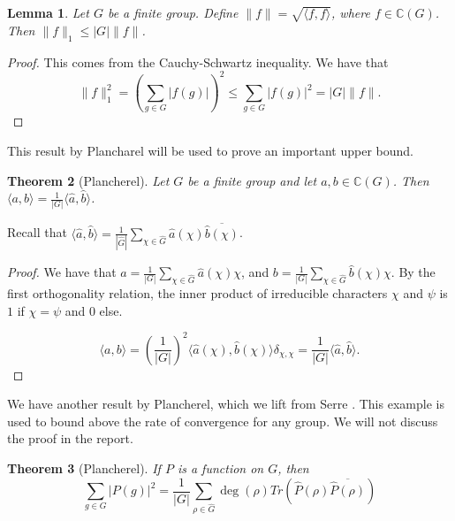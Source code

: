 \documentclass[]{article}
\newtheorem{theorem}{Theorem}
\newtheorem{lemma}[theorem]{Lemma}
\theoremstyle{definition}
\numberwithin{theorem}{section}
\numberwithin{equation}{section}
\begin{document}
\begin{lemma}
	\label{lem:Absolute Value Inequality}
	Let $G$ be a finite group. Define $\|f\| = \sqrt{\langle f, f \rangle}$, where $f \in \mathbb{C}(G)$. Then $\|f \|_1 \leq |G| \|f \|$.
\end{lemma}
\begin{proof}
	This comes from the Cauchy-Schwartz inequality. We have that \begin{equation}
		\| f \|_1^2 = \left(\sum_{g \in G} |f(g)|\right)^2 \leq \sum_{g \in G} |f(g)|^2 = |G| \| f\|.
	\end{equation}
\end{proof}
This result by Plancharel will be used to prove an important upper bound. 

\begin{theorem}[Plancherel]
	\label{thm:Plancherel}
	Let $G$ be a finite group and let $a, b \in \mathbb{C}(G)$. Then $\langle a, b \rangle = \frac{1}{|G|} \langle \widehat{a}, \widehat{b} \rangle$. 
\end{theorem}
Recall that $\langle \widehat{a}, \widehat{b} \rangle = \frac{1}{|\widehat{G}|} \sum_{\chi \in \widehat{G}} \widehat{a}(\chi) \overline{\widehat{b}(\chi)}$. 
\begin{proof}
	We have that $a =\frac{1}{|G|} \sum_{\chi \in \widehat{G}} \widehat{a}(\chi) \chi$, and $b = \frac{1}{|G|} \sum_{\chi \in \widehat{G}} \widehat{b}(\chi) \chi$. By the first orthogonality relation, the inner product of irreducible characters $\chi$ and $\psi$ is $1$ if $\chi = \psi$ and 0 else.
	
	\begin{equation}
		\langle a, b \rangle = \left(\frac{1}{|G|}\right)^2 \langle \widehat{a}(\chi), \widehat{b}(\chi) \rangle \delta_{\chi, \chi} = \frac{1}{|G|} \langle \widehat{a}, \widehat{b} \rangle.
	\end{equation}

\end{proof}
We have another result by Plancherel, which we lift from Serre \cite{serreExamples1977}. This example is used to bound above the rate of convergence for any group. We will not discuss the proof in the report.
\begin{theorem}[Plancherel]\label{lem:Plancharel formula}
	If $P$ is a function on $G$, then
	\begin{equation}
		\sum_{g \in G}|P(g)|^2 = \frac{1}{|G|} \sum_{\rho \in \widehat{G}} \deg(\rho) Tr(\widehat{P}(\rho) \overline{\widehat{P}(\rho)}) 
	\end{equation}
\end{theorem}
\end{document}
